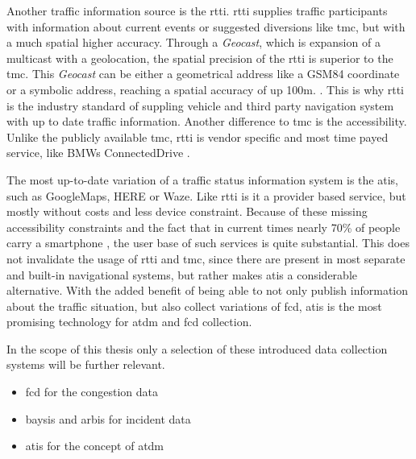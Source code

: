 \documentclass[a4paper,12pt]{report}
\begin{document}
Another traffic information source is the \acrshort{rtti}. \acrshort{rtti} supplies traffic participants with information about current events or suggested diversions like \acrfull{tmc}, but with a much spatial higher accuracy. Through a \textit{Geocast}, which is expansion of a multicast with a geolocation, the spatial precision of the \acrshort{rtti} is superior to the \acrshort{tmc}. This \textit{Geocast} can be either a geometrical address like a GSM84 coordinate or a symbolic address, reaching a spatial accuracy of up 100m.  \cite{LAPID2020,HindenDeering2006,ImielinskiNavas1996}. This is why \acrshort{rtti} is the industry standard of suppling vehicle and third party navigation system with up to date traffic information. Another difference to \acrshort{tmc} is the accessibility. Unlike the publicly available \acrshort{tmc}, \acrshort{rtti} is vendor specific and most time payed service, like BMWs ConnectedDrive \cite{BMW2020}. 


The most up-to-date variation of a traffic status information system is the \acrfull{atis}, such as GoogleMaps, HERE or Waze. Like \acrshort{rtti} is it a provider based service, but mostly without costs and less device constraint. Because of these missing accessibility constraints and the fact that in current times nearly 70\% of people carry a smartphone \cite{IZM2020}, the user base of such services is quite substantial. This does not invalidate the usage of \acrshort{rtti} and \acrshort{tmc}, since there are present in most separate and built-in navigational systems, but rather makes \acrshort{atis} a considerable alternative. With the added benefit of being able to not only publish information about the traffic situation, but also collect variations of \acrshort{fcd}, \acrshort{atis} is the most promising technology for \acrshort{atdm} and \acrshort{fcd} collection. 

\bigskip

In the scope of this thesis only a selection of these introduced data collection systems will be further relevant. 
\begin{itemize}
  \item \acrshort{fcd} for the congestion data
  \item \acrshort{baysis} and \acrshort{arbis} for incident data
  \item \acrshort{atis} for the concept of \acrshort{atdm}
\end{itemize}
\end{document}
